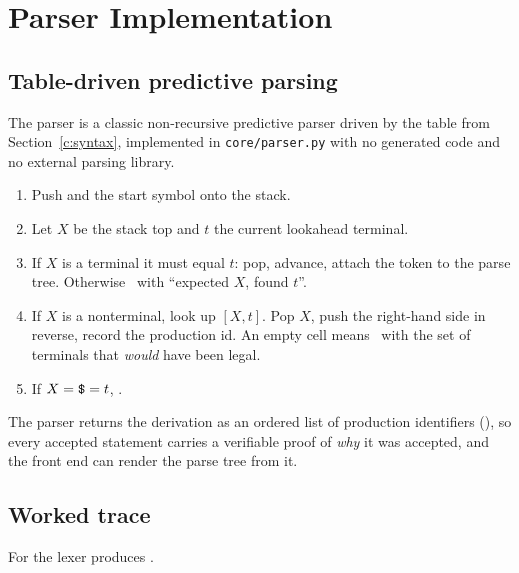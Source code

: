 \section{Parser Implementation}\label{c:parser}

\subsection{Table-driven predictive parsing}

The parser is a classic non-recursive predictive parser driven by the table from
Section~\ref{c:syntax}, implemented in \texttt{core/parser.py} with no generated code and
no external parsing library.

\begin{enumerate}[leftmargin=1.4em, itemsep=0.05em]
  \item Push \term{\$} and the start symbol  onto the stack.
  \item Let $X$ be the stack top and $t$ the current lookahead terminal.
  \item If $X$ is a terminal it must equal $t$: pop, advance, attach the token to the parse
        tree. Otherwise \rejected\ with ``expected $X$, found $t$''.
  \item If $X$ is a nonterminal, look up $[X, t]$. Pop $X$, push the right-hand side in
        reverse, record the production id. An empty cell means \rejected\ with the set of
        terminals that \emph{would} have been legal.
  \item If $X = \texttt{\$} = t$, \accepted.
\end{enumerate}

The parser returns the derivation as an ordered list of production identifiers
(), so every accepted statement carries a verifiable proof of \emph{why} it was
accepted, and the front end can render the parse tree from it.


\subsection{Worked trace}

For  the lexer produces .

